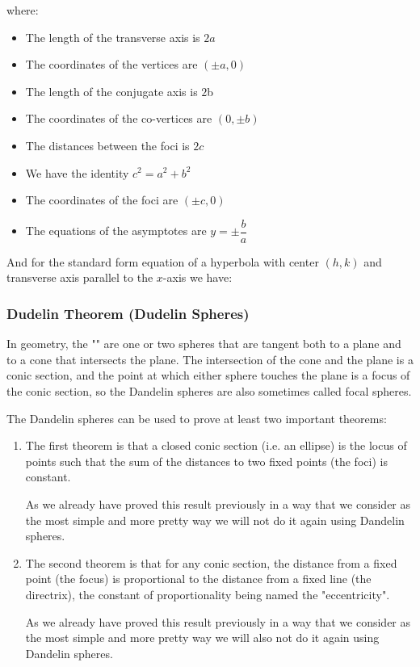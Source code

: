 	where:
	\begin{itemize}
		\item The length of the transverse axis is $2a$
		\item The coordinates of the vertices are $(\pm a,0)$
		\item The length of the conjugate axis is $2$b
		\item The coordinates of the co-vertices are $(0,\pm b)$
		\item The distances between the foci is $2c$
		\item We have the identity $c^2=a^2+b^2$
		\item The coordinates of the foci are $(\pm c,0)$
		\item The equations of the asymptotes are $y=\pm\displaystyle \dfrac{b}{a}$
	\end{itemize}
	And for the standard form equation of a hyperbola with center $(h,k)$ and transverse axis parallel to the $x$-axis we have:
	
	
	\pagebreak
	\subsubsection{Dudelin Theorem (Dudelin Spheres)}
	In geometry, the "" are one or two spheres that are tangent both to a plane and to a cone that intersects the plane. The intersection of the cone and the plane is a conic section, and the point at which either sphere touches the plane is a focus of the conic section, so the Dandelin spheres are also sometimes called focal spheres.
	
	The Dandelin spheres can be used to prove at least two important theorems:
	\begin{enumerate}
		\item The first theorem is that a closed conic section (i.e. an ellipse) is the locus of points such that the sum of the distances to two fixed points (the foci) is constant. 
		
		As we already have proved this result previously in a way that we consider as the most simple and more pretty way we will not do it again using Dandelin spheres.

		\item The second theorem is that for any conic section, the distance from a fixed point (the focus) is proportional to the distance from a fixed line (the directrix), the constant of proportionality being named the "eccentricity".
		
		As we already have proved this result previously in a way that we consider as the most simple and more pretty way we will also not do it again using Dandelin spheres. 
	\end{enumerate}
	
